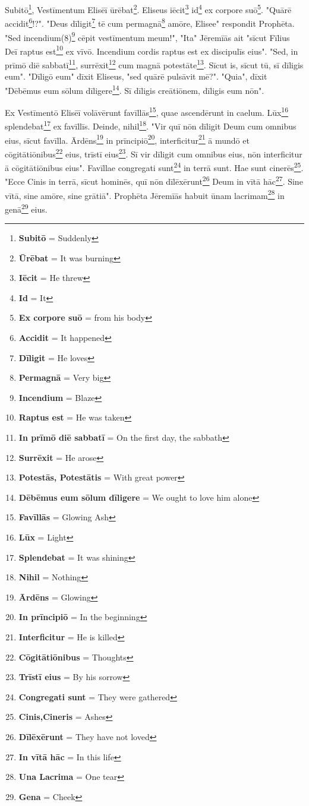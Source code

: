Subitō\footnote{\textbf{Subitō} = Suddenly}, Vestīmentum Elisēī ūrēbat\footnote{\textbf{Ūrēbat} = It was burning}. Eliseus iēcit\footnote{\textbf{Iēcit} = He threw} id\footnote{\textbf{Id} = It} ex corpore suō\footnote{\textbf{Ex corpore suō} = from his body}. "Quārē accidit\footnote{\textbf{Accidit} = It happened}!?". "Deus dīligit\footnote{\textbf{Dīligit} = He loves} tē cum permagnā\footnote{\textbf{Permagnā} = Very big} amōre, Elisee" respondit Prophēta. "Sed incendium(8)\footnote{\textbf{Incendium} = Blaze} cēpit vestīmentum meum!", "Ita" Jēremīās ait "sīcut Fīlius Deī raptus est\footnote{\textbf{Raptus est} = He was taken} ex vīvō. Incendium cordis raptus est ex discipulīs eius". "Sed, in prīmō diē sabbatī\footnote{\textbf{In prīmō diē sabbatī} = On the first day, the sabbath}, surrēxit\footnote{\textbf{Surrēxit} = He arose} cum magnā potestāte\footnote{\textbf{Potestās, Potestātis} = With great power}. Sīcut is, sīcut tū, sī dīligis eum". "Dīligō eum" dīxit Eliseus, "sed quārē pulsāvit mē?". "Quia", dīxit "Dēbēmus eum sōlum dīligere\footnote{\textbf{Dēbēmus eum sōlum dīligere} = We ought to love him alone}. Sī dīligis creātiōnem, dīligis eum nōn". \par 
Ex Vestīmentō Elisēī volāvērunt favīllās\footnote{\textbf{Favīllās} = Glowing Ash}, quae ascendērunt in caelum. Lūx\footnote{\textbf{Lūx} = Light} splendebat\footnote{\textbf{Splendebat} = It was shining} ex favīllīs. Deinde, nihil\footnote{\textbf{Nihil} = Nothing}. "Vir quī nōn dīligit Deum cum omnibus eius, sīcut favīlla. Ārdēns\footnote{\textbf{Ārdēns} = Glowing} in prīncipiō\footnote{\textbf{In prīncipiō} = In the beginning}, interficitur\footnote{\textbf{Interficitur} = He is killed} ā mundō et cōgitātiōnibus\footnote{\textbf{Cōgitātiōnibus} = Thoughts} eius, trīstī eius\footnote{\textbf{Trīstī eius} = By his sorrow}. Sī vir dīligit cum omnibus eius, nōn interficitur ā cōgitātiōnibus eius". Favīllae congregati sunt\footnote{\textbf{Congregati sunt} = They were gathered} in terrā sunt. Hae sunt cinerēs\footnote{\textbf{Cinis,Cineris} = Ashes}. "Ecce Cinis in terrā, sīcut hominēs, quī nōn dīlēxērunt\footnote{\textbf{Dīlēxērunt} = They have not loved} Deum in vītā hāc\footnote{\textbf{In vītā hāc} = In this life}. Sine vītā, sine amōre, sine grātiā". Prophēta Jēremīās habuit ūnam lacrimam\footnote{\textbf{Una Lacrima} = One tear} in genā\footnote{\textbf{Gena} = Cheek} eius. \par 
